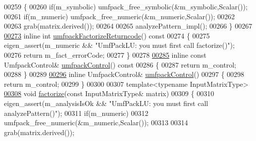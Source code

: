 \begin{DoxyCode}
00259     \{
00260       \textcolor{keywordflow}{if}(m\_symbolic) umfpack\_free\_symbolic(&m\_symbolic,Scalar());
00261       \textcolor{keywordflow}{if}(m\_numeric)  umfpack\_free\_numeric(&m\_numeric,Scalar());
00262 
00263       grab(matrix.derived());
00264 
00265       analyzePattern\_impl();
00266     \}
00267 
\hyperlink{class_eigen_1_1_umf_pack_l_u_a822fa9d82754269c379dc4ce17920b0a}{00273}     \textcolor{keyword}{inline} \textcolor{keywordtype}{int} \hyperlink{class_eigen_1_1_umf_pack_l_u_a822fa9d82754269c379dc4ce17920b0a}{umfpackFactorizeReturncode}()\textcolor{keyword}{ const}
00274 \textcolor{keyword}{    }\{
00275       eigen\_assert(m\_numeric && \textcolor{stringliteral}{"UmfPackLU: you must first call factorize()"});
00276       \textcolor{keywordflow}{return} m\_fact\_errorCode;
00277     \}
00278 
\hyperlink{class_eigen_1_1_umf_pack_l_u_ae83d178202f3d44c1789c1c93842bf2e}{00285}     \textcolor{keyword}{inline} \textcolor{keyword}{const} UmfpackControl& \hyperlink{class_eigen_1_1_umf_pack_l_u_ae83d178202f3d44c1789c1c93842bf2e}{umfpackControl}()\textcolor{keyword}{ const}
00286 \textcolor{keyword}{    }\{
00287       \textcolor{keywordflow}{return} m\_control;
00288     \}
00289 
\hyperlink{class_eigen_1_1_umf_pack_l_u_a679bd267a0407d4ca985d97f0b864101}{00296}     \textcolor{keyword}{inline} UmfpackControl& \hyperlink{class_eigen_1_1_umf_pack_l_u_a679bd267a0407d4ca985d97f0b864101}{umfpackControl}()
00297     \{
00298       \textcolor{keywordflow}{return} m\_control;
00299     \}
00300 
00307     \textcolor{keyword}{template}<\textcolor{keyword}{typename} InputMatrixType>
\hyperlink{class_eigen_1_1_umf_pack_l_u_a1471bf890503e743c45d75cc02a5345d}{00308}     \textcolor{keywordtype}{void} \hyperlink{class_eigen_1_1_umf_pack_l_u_a1471bf890503e743c45d75cc02a5345d}{factorize}(\textcolor{keyword}{const} InputMatrixType& matrix)
00309     \{
00310       eigen\_assert(m\_analysisIsOk && \textcolor{stringliteral}{"UmfPackLU: you must first call analyzePattern()"});
00311       \textcolor{keywordflow}{if}(m\_numeric)
00312         umfpack\_free\_numeric(&m\_numeric,Scalar());
00313 
00314       grab(matrix.derived());

\end{DoxyCode}

